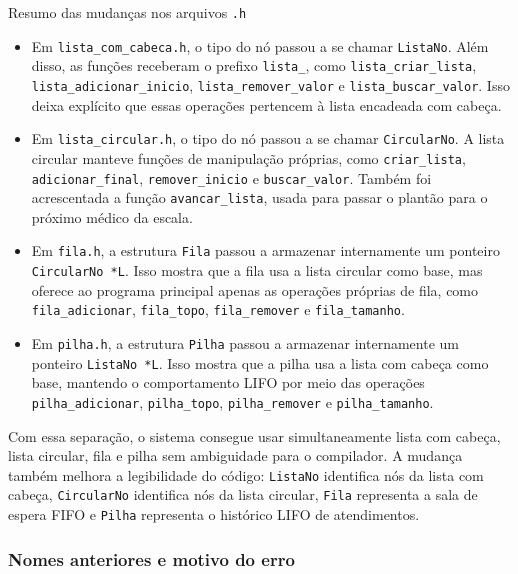 \documentclass[11pt,a4paper]{article}
\begin{document}
\begin{destaquebox}{Resumo das mudanças nos arquivos \texttt{.h}}
\begin{itemize}
    \item Em \texttt{lista\_com\_cabeca.h}, o tipo do nó passou a se chamar \texttt{ListaNo}. Além disso, as funções receberam o prefixo \texttt{lista\_}, como \texttt{lista\_criar\_lista}, \texttt{lista\_adicionar\_inicio}, \texttt{lista\_remover\_valor} e \texttt{lista\_buscar\_valor}. Isso deixa explícito que essas operações pertencem à lista encadeada com cabeça.
    
    \item Em \texttt{lista\_circular.h}, o tipo do nó passou a se chamar \texttt{CircularNo}. A lista circular manteve funções de manipulação próprias, como \texttt{criar\_lista}, \texttt{adicionar\_final}, \texttt{remover\_inicio} e \texttt{buscar\_valor}. Também foi acrescentada a função \texttt{avancar\_lista}, usada para passar o plantão para o próximo médico da escala.
    
    \item Em \texttt{fila.h}, a estrutura \texttt{Fila} passou a armazenar internamente um ponteiro \texttt{CircularNo *L}. Isso mostra que a fila usa a lista circular como base, mas oferece ao programa principal apenas as operações próprias de fila, como \texttt{fila\_adicionar}, \texttt{fila\_topo}, \texttt{fila\_remover} e \texttt{fila\_tamanho}.
    
    \item Em \texttt{pilha.h}, a estrutura \texttt{Pilha} passou a armazenar internamente um ponteiro \texttt{ListaNo *L}. Isso mostra que a pilha usa a lista com cabeça como base, mantendo o comportamento LIFO por meio das operações \texttt{pilha\_adicionar}, \texttt{pilha\_topo}, \texttt{pilha\_remover} e \texttt{pilha\_tamanho}.
\end{itemize}
\end{destaquebox}

Com essa separação, o sistema consegue usar simultaneamente lista com cabeça, lista circular, fila e pilha sem ambiguidade para o compilador. A mudança também melhora a legibilidade do código: \texttt{ListaNo} identifica nós da lista com cabeça, \texttt{CircularNo} identifica nós da lista circular, \texttt{Fila} representa a sala de espera FIFO e \texttt{Pilha} representa o histórico LIFO de atendimentos.

\subsubsection{Nomes anteriores e motivo do erro}
\end{document}
